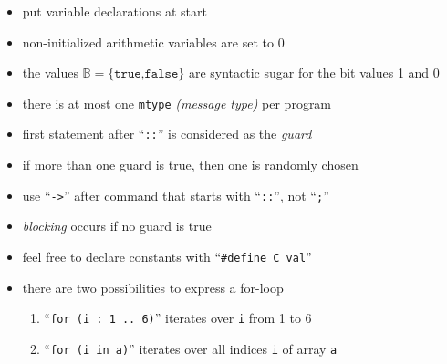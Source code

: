 \begin{itemize}
\item put variable declarations at start
\item non-initialized arithmetic variables are set to 0
\item the values $\mathbb B = \{\texttt{true,false}\}$ are syntactic sugar for the bit values 1 and 0
\item there is at most one \texttt{mtype} \emph{(message type)} per program
\item first statement after ``\texttt{::}'' is considered as the \emph{guard}
\item if more than one guard is true, then one is randomly chosen
\item use ``\texttt{->}'' after command that starts with ``\texttt{::}'', not ``\texttt{;}''
\item \emph{blocking} occurs if no guard is true
\item feel free to declare constants with ``\texttt{\#define C val}''
\item there are two possibilities to express a for-loop
\begin{enumerate}
\item ``\texttt{for (i : 1 .. 6)}'' iterates over \texttt{i} from 1 to 6
\item ``\texttt{for (i in a)}'' iterates over all indices \texttt{i} of array \texttt{a}
\end{enumerate}
\end{itemize}